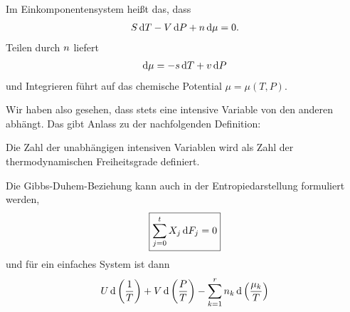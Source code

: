 Im Einkomponentensystem heißt das, dass
\begin{align*}
    S\mathop{}\!\mathrm{d} T - V\mathop{}\!\mathrm{d} P + n \mathop{}\!\mathrm{d} \mu = 0.
\end{align*}
Teilen durch $n$ liefert
\begin{align*}
    \mathop{}\!\mathrm{d} \mu = -s \mathop{}\!\mathrm{d} T + v\mathop{}\!\mathrm{d} P
\end{align*}
und Integrieren führt auf das chemische Potential $\mu=\mu(T,P)$.

Wir haben also gesehen, dass stets eine intensive Variable von den anderen abhängt. Das gibt Anlass zu der nachfolgenden Definition:
\begin{formal}
    Die Zahl der unabhängigen intensiven Variablen wird als Zahl der thermodynamischen Freiheitsgrade definiert.
\end{formal}

Die Gibbs-Duhem-Beziehung kann auch in der Entropiedarstellung formuliert werden,
\begin{align*}
    \boxed{\sum_{j=0}^t X_j \mathop{}\!\mathrm{d} F_j = 0}
\end{align*}
und für ein einfaches System ist dann
\begin{align*}
    U\mathop{}\!\mathrm{d}\left(\frac{1}{T}\right) + V\mathop{}\!\mathrm{d}\left(\frac{P}{T}\right)-\sum_{k=1}^r n_k\mathop{}\!\mathrm{d}\left(\frac{\mu_k}{T}\right)
\end{align*}
